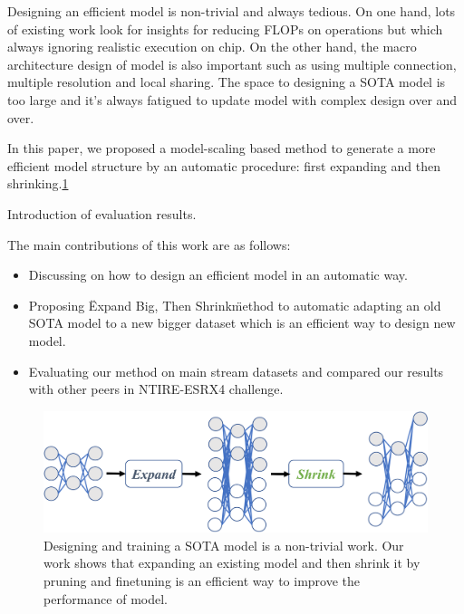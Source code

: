\documentclass[10pt,twocolumn,letterpaper]{article}
\begin{document}
Designing an efficient model is non-trivial and always tedious. On one hand, lots of existing work look for insights for reducing FLOPs on operations but which always ignoring realistic execution on chip. On the other hand, the macro architecture design of model is also important such as using multiple connection, multiple resolution and local sharing. The space to designing a SOTA model is too large and it's always fatigued to update model with complex design over and over.

In this paper, we proposed a model-scaling based method to generate a more efficient model structure by an automatic procedure: first expanding and then shrinking.\ref{fig:overview}

Introduction of evaluation results.

The main contributions of this work are as follows:

\begin{itemize}
    \item Discussing on how to design an efficient model in an automatic way.
    \item Proposing \"Expand Big, Then Shrink\" method to automatic adapting an old SOTA model to a new bigger dataset which is an efficient way to design new model.
    \item Evaluating our method on main stream datasets and compared our results with other peers in NTIRE-ESRX4 challenge.
\end{itemize}

\begin{figure}[t]
  \centering
   \includegraphics[width=0.8\linewidth]{../expandandshrink.pdf}

   \caption{Designing and training a SOTA model is a non-trivial work. Our work shows that expanding an existing model and then shrink it by pruning and finetuning is an efficient way to improve the performance of model.}
   \label{fig:overview}
\end{figure}



\end{document}
